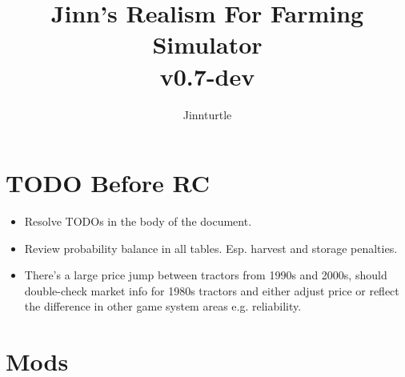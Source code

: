 \documentclass[a4paper,10pt]{article}
\begin{document}
\newlength{\tabcolsepDefault}
\setlength{\tabcolsepDefault}{\tabcolsep}




\newcommand{\textbi}[1]{\textbf{\textit{#1}}}

\newcommand{\projName}{Jinn's Realism For Farming Simulator}
\newcommand{\projVersion}{v0.7-dev}

\newcommand{\refPageref}[1]{\ref{#1} (p. \pageref{#1})}


\title{\projName{}\\ \projVersion{}}
\author{Jinnturtle}

\maketitle
\tableofcontents


\section{TODO Before RC}
\begin{itemize}
\item Resolve TODOs in the body of the document.
\item Review probability balance in all tables. Esp. harvest and storage
  penalties.
\item There's a large price jump between tractors from 1990s and 2000s,
  should double-check market info for 1980s tractors and either adjust price or
  reflect the difference in other game system areas e.g. reliability.
\end{itemize}


\section{Mods}
\end{document}
